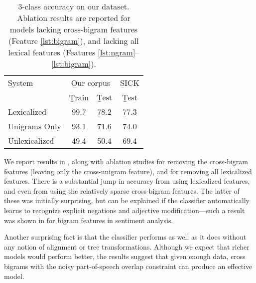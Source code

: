 \begin{table}
\begin{center}
\def\t#1{\small{#1}}
\begin{tabular}{l@{\hskip \colspaceL}c@{\hskip \colspaceS}c@{\hskip \colspaceL}c}
\toprule
\b{System}	 & \multicolumn{2}{c}{\b{Our corpus}} & \b{SICK}\vspace{-0.5mm}\\
 & \b{Train} & \b{Test} & \b{Test} \vspace{-0.5mm}\\
\midrule
\t{Lexicalized}            & \t{99.7}  & \b{78.2} & \b{77.3} \\ %
\t{Unigrams Only}          & \t{93.1} & \t{71.6} & \t{74.0} \\ %
\t{Unlexicalized}          & \t{49.4} & \t{50.4} & \t{69.4}\\ %
\bottomrule
\end{tabular}
\end{center}
\caption{
\label{tab:bowresults}
3-class accuracy on our dataset.
Ablation results are reported for models lacking cross-bigram features 
  (Feature \ref{lst:bigram}), and lacking all lexical
  features (Features \ref{lst:ngram}--\ref{lst:bigram}).
}
\end{table}
%
%


We report results in , along with ablation studies for removing
  the cross-bigram features (leaving only the cross-unigram feature),
  and for removing all lexicalized features.
There is a substantial jump in accuracy from using
  lexicalized features, and even from using the relatively sparse
  cross-bigram features.
The latter of these was initially surprising, but can be explained if
  the classifier automatically learns to recognize explicit negations and adjective
  modification---such a result was shown in
   for bigram features in sentiment analysis.
  
Another surprising fact is that the classifier performs as well as it
  does without any notion of alignment or tree transformations.
Although we expect that richer models would perform better,
  the results suggest that given enough data, cross bigrams with the noisy 
  part-of-speech overlap constraint can produce an effective model.


